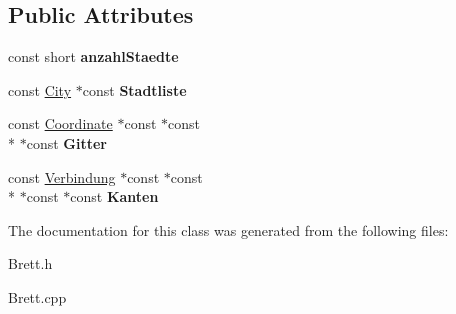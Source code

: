 \subsection*{Public Attributes}
\begin{DoxyCompactItemize}
\item 
\hypertarget{class_brett_a1b42422ecdc5c52503fbb247f1d6f838}{const short {\bfseries anzahl\-Staedte}}\label{class_brett_a1b42422ecdc5c52503fbb247f1d6f838}

\item 
\hypertarget{class_brett_aaeb137614f32b70102b1ec2620cadcfd}{const \hyperlink{class_city}{City} $\ast$const {\bfseries Stadtliste}}\label{class_brett_aaeb137614f32b70102b1ec2620cadcfd}

\item 
\hypertarget{class_brett_aed2d07eea45ab2dfc98dfad234c50f43}{const \hyperlink{class_coordinate}{Coordinate} $\ast$const $\ast$const \\*
$\ast$const {\bfseries Gitter}}\label{class_brett_aed2d07eea45ab2dfc98dfad234c50f43}

\item 
\hypertarget{class_brett_a9685bc6076da6752c6c619e3798d04c3}{const \hyperlink{class_verbindung}{Verbindung} $\ast$const $\ast$const \\*
$\ast$const $\ast$const {\bfseries Kanten}}\label{class_brett_a9685bc6076da6752c6c619e3798d04c3}

\end{DoxyCompactItemize}


The documentation for this class was generated from the following files\-:\begin{DoxyCompactItemize}
\item 
Brett.\-h\item 
Brett.\-cpp\end{DoxyCompactItemize}
